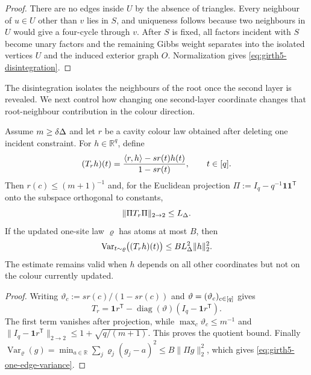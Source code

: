 \begin{proof}
There are no edges inside $U$ by the absence of triangles.  Every neighbour
of $u\in U$ other than $v$ lies in $S$, and uniqueness follows because two
neighbours in $U$ would give a four-cycle through $v$.  After $S$ is fixed, all
factors incident with $S$ become unary factors and the remaining Gibbs weight
separates into the isolated vertices $U$ and the induced exterior graph $O$.
Normalization gives \eqref{eq:girth5-disintegration}.
\end{proof}

The disintegration isolates the neighbours of the root once the second layer is
revealed.  We next control how changing one second-layer coordinate changes
that root-neighbour contribution in the colour direction.

\begin{lemma}
\label{lem:girth5-one-edge}
Assume $m\ge\delta\Delta$ and let $r$ be a cavity colour law obtained after
deleting one incident constraint.  For $h\in\mathbb R^q$, define
\[
 (T_r h)(t)=\frac{\langle r,h\rangle-sr(t)h(t)}{1-sr(t)},
 \qquad t\in[q].
\]
Then $r(c)\le(m+1)^{-1}$ and, for the Euclidean projection
$\Pi:=I_q-q^{-1}\mathbf1\mathbf1^{\mathsf T}$ onto the subspace
orthogonal to constants,
\[
 \|\Pi T_r\Pi\|_{2\to2}\le L_\Delta.
\]
If the updated one-site law $\varrho$ has atoms at most $B$, then
\begin{equation}\label{eq:girth5-one-edge-variance}
 \operatorname{Var}_{t\sim\varrho}\bigl((T_rh)(t)\bigr)
 \le BL_\Delta^2\|h\|_2^2.
\end{equation}
The estimate remains valid when $h$ depends on all other coordinates but not
on the colour currently updated.
\end{lemma}

\begin{proof}
Writing $\vartheta_c:=sr(c)/(1-sr(c))$ and
$\vartheta=(\vartheta_c)_{c\in[q]}$ gives
\[
 T_r=\mathbf1r^{\mathsf T}-\operatorname{diag}(\vartheta)
 (I_q-\mathbf1r^{\mathsf T}).
\]
The first term vanishes after projection, while
$\max_c\vartheta_c\le m^{-1}$ and
$\|I_q-\mathbf1r^{\mathsf T}\|_{2\to2}\le1+\sqrt{q/(m+1)}$.  This proves the quotient
bound.  Finally
$\operatorname{Var}_{\varrho}(g)=\min_{a\in\mathbb R}
\sum_j\varrho_j(g_j-a)^2\le B\|\Pi g\|_2^2$, which gives \eqref{eq:girth5-one-edge-variance}.
\end{proof}

